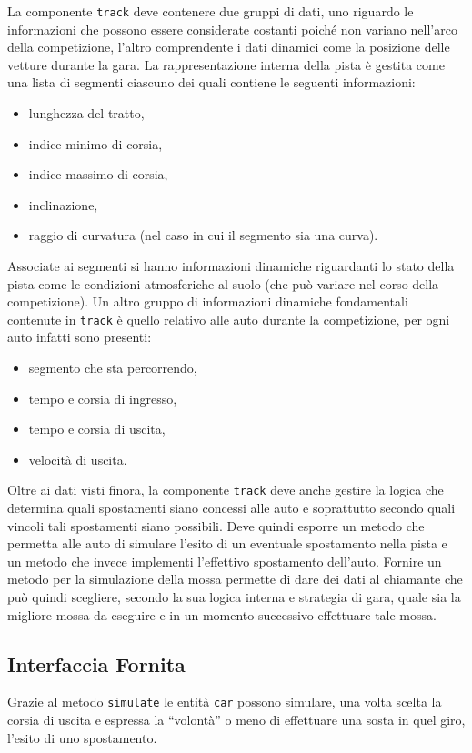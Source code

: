 \documentclass[11pt,a4paper]{report}
\newcommand{\fun}[1]{\texttt{#1}}
\begin{document}
La componente \texttt{track} deve contenere due gruppi di dati, uno riguardo le informazioni che possono essere considerate costanti poiché non variano nell'arco della competizione, l'altro comprendente i dati dinamici come la posizione delle vetture durante la gara.
La rappresentazione interna della pista è gestita come una lista di segmenti ciascuno dei quali contiene le seguenti informazioni:
\begin{itemize}
\item lunghezza del tratto,
\item indice minimo di corsia,
\item indice massimo di corsia,
\item inclinazione,
\item raggio di curvatura (nel caso in cui il segmento sia una curva).
\end{itemize}
Associate ai segmenti si hanno informazioni dinamiche riguardanti lo stato della pista come le condizioni atmosferiche al suolo (che può variare nel corso della competizione).
Un altro gruppo di informazioni dinamiche fondamentali contenute in \texttt{track} è quello relativo alle auto durante la competizione, per ogni auto infatti sono presenti:
\begin{itemize}
\item segmento che sta percorrendo,
\item tempo e corsia di ingresso,
\item tempo e corsia di uscita,
\item velocità di uscita.
\end{itemize}

Oltre ai dati visti finora, la componente \texttt{track} deve anche gestire la logica che determina quali spostamenti siano concessi alle auto e soprattutto secondo quali vincoli tali spostamenti siano possibili. Deve quindi esporre un metodo che permetta alle auto di simulare l'esito di un eventuale spostamento nella pista e un metodo che invece implementi l'effettivo spostamento dell'auto. Fornire un metodo per la simulazione della mossa permette di dare dei dati al chiamante che può quindi scegliere, secondo la sua logica interna e strategia di gara, quale sia la migliore mossa da eseguire e in un momento successivo effettuare tale mossa.

\subsection*{Interfaccia Fornita}
Grazie al metodo \fun{simulate} le entità \texttt{car} possono simulare, una volta scelta la corsia di uscita e espressa la ``volontà'' o meno di effettuare una sosta in quel giro, l'esito di uno spostamento.
\end{document}
